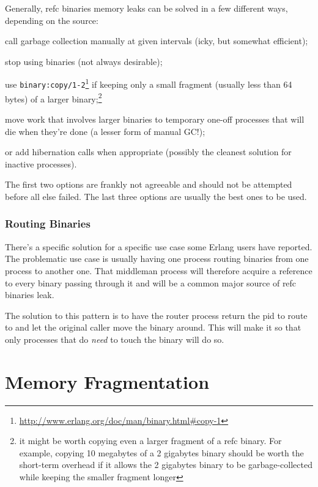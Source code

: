 \documentclass[11pt, oneside]{book}   	%
\newcommand{\function}[1]{\Verb`#1`}
\begin{document}
Generally, refc binaries memory leaks can be solved in a few different ways, depending on the source:

\begin{itemize*}
	\item call garbage collection manually at given intervals (icky, but somewhat efficient);
	\item stop using binaries (not always desirable);
	\item use \function{binary:copy/1-2}\footnote{\href{http://www.erlang.org/doc/man/binary.html\#copy-1}{http://www.erlang.org/doc/man/binary.html\#copy-1}} if keeping only a small fragment (usually less than 64 bytes) of a larger binary;\footnote{it might be worth copying even a larger fragment of a refc binary. For example, copying 10 megabytes of a 2 gigabytes binary should be worth the short-term overhead if it allows the 2 gigabytes binary to be garbage-collected while keeping the smaller fragment longer}
	\item move work that involves larger binaries to temporary one-off processes that will die when they're done (a lesser form of manual GC!);
	\item or add hibernation calls when appropriate (possibly the cleanest solution for inactive processes).
\end{itemize*}

The first two options are frankly not agreeable and should not be attempted before all else failed. The last three options are usually the best ones to be used.

\subsubsection{Routing Binaries}

There's a specific solution for a specific use case some Erlang users have reported. The problematic use case is usually having one process routing binaries from one process to another one. That middleman process will therefore acquire a reference to every binary passing through it and will be a common major source of refc binaries leak.

The solution to this pattern is to have the router process return the pid to route to and let the original caller move the binary around. This will make it so that only processes that do \emph{need} to touch the binary will do so.

\section{Memory Fragmentation}
\label{sec:memory-fragmentation}
\end{document}
